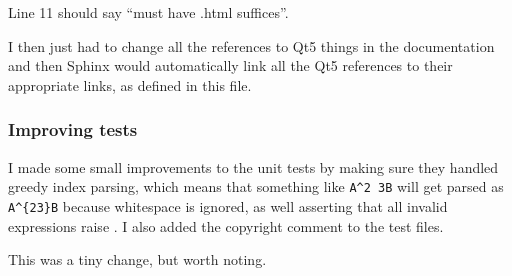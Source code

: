 \documentclass[../development.tex]{subfiles}
\begin{document}

Line 11 should say \enquote{must have .html suffices}.


I then just had to change all the references to Qt5 things in the documentation and then Sphinx would automatically link all the Qt5 references to their appropriate links, as defined in this file.

\subsubsection{Improving tests\label{development:preparing-for-v0.2.1:improving-tests}}

I made some small improvements to the unit tests by making sure they handled greedy index parsing, which means that something like \texttt{A\textasciicircum2 3B} will get parsed as \texttt{A\textasciicircum\{23\}B} because whitespace is ignored, as well asserting that all invalid expressions raise . I also added the copyright comment to the test files.

This was a tiny change, but worth noting.


\end{document}
